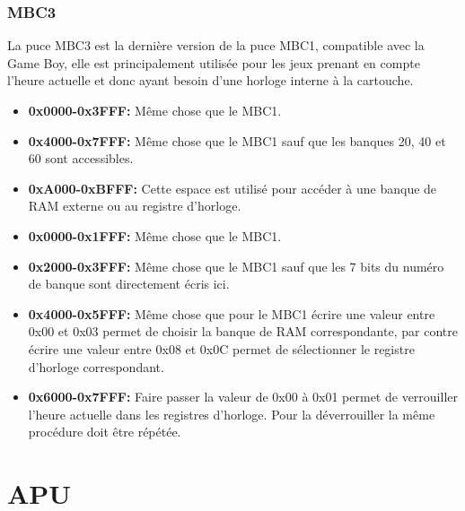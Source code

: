 \documentclass{report}
\begin{document}
\subsubsection{MBC3}
	La puce MBC3 est la dernière version de la puce MBC1, compatible avec la Game Boy, elle est principalement utilisée pour les jeux prenant en compte l'heure actuelle et donc ayant besoin d'une horloge interne à la cartouche.\\
\begin{itemize}
\item \textbf{0x0000-0x3FFF:} Même chose que le MBC1.\\
\item \textbf{0x4000-0x7FFF:} Même chose que le MBC1 sauf que les banques 20, 40 et 60 sont accessibles.\\
\item \textbf{0xA000-0xBFFF:} Cette espace est utilisé pour accéder à une banque de RAM externe ou au registre d'horloge.\\
\item \textbf{0x0000-0x1FFF:} Même chose que le MBC1.\\
\item \textbf{0x2000-0x3FFF:} Même chose que le MBC1 sauf que les 7 bits du numéro de banque sont directement écris ici.\\
\item \textbf{0x4000-0x5FFF:} Même chose que pour le MBC1 écrire une valeur entre 0x00 et 0x03 permet de choisir la banque de RAM correspondante, par contre écrire une valeur entre 0x08 et 0x0C permet de sélectionner le registre d'horloge correspondant.\\
\item \textbf{0x6000-0x7FFF:} Faire passer la valeur de 0x00 à 0x01 permet de verrouiller l'heure actuelle dans les registres d'horloge. Pour la déverrouiller la même procédure doit être répétée.\\ 
\end{itemize}


\section{APU}
\end{document}
